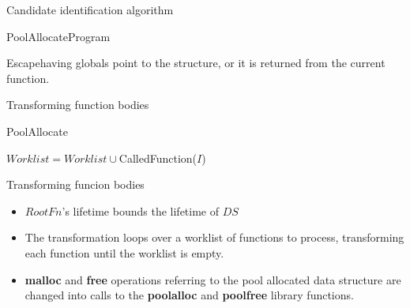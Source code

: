 \documentclass{beamer}
\begin{document}
\begin{frame}{Candidate identification algorithm}
  \begin{algorithm}[H]
	\caption{PoolAllocateProgram}
	\begin{algorithmic}[1]
	\ENDIF
	\ENDIF
	\ENDFOR
	\ENDFOR
	\end{algorithmic}
  \end{algorithm}
  \begin{block}{Escape}having globals point to the
structure, or it is returned from the current function.
  \end{block}
\end{frame}

\begin{frame}{Transforming function bodies}
  \begin{algorithm}[H]
	\caption{PoolAllocate}
	\begin{algorithmic}[1]
	\STATE $Worklist = Worklist \cup $CalledFunction($I$)
	\ENDIF
	\ENDIF
	\ENDFOR
	\ENDFOR
	\end{algorithmic}
  \end{algorithm}
\end{frame}

\begin{frame}{Transforming funcion bodies}
  \begin{itemize}
	  \setlength{\itemsep}{0.5cm}
	\item $RootFn$'s lifetime bounds the lifetime of $DS$
	  \item The transformation loops over a worklist of functions to process,
transforming each function until the worklist is empty.
\item \textbf{malloc} and \textbf{free} operations referring to the pool allocated
  data structure are changed into calls to the \textbf{poolalloc} and
  \textbf{poolfree} library functions.
  \end{itemize}

\end{frame}
\end{document}
